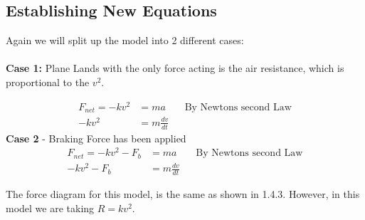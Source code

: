 \subsection{Establishing New Equations}
Again we will split up the model into 2 different cases:
\\ \\
\textbf{Case 1: }Plane Lands with the only force acting is the air resistance, which is proportional to the $v^2$.

\begin{align*}
    F_{net} = -kv^2 &= ma && \text{By Newtons second Law}
    \\ -kv^2 &= m \frac{dv}{dt}
\end{align*}
\textbf{Case 2} - Braking Force has been applied
\begin{align*}
    F_{net} = -kv^2 - F_b &= ma && \text{By Newtons second Law}
    \\ -kv^2 - F_b &= m \frac{dv}{dt}
\end{align*}

The force diagram for this model, is the same as shown in 1.4.3. However, in this model we are taking $R = kv^2$.